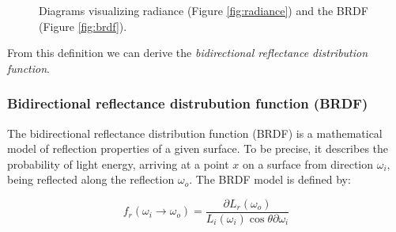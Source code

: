 \begin{figure}[h]
	\centering
	\hfill
	\caption{Diagrams visualizing radiance (Figure \ref{fig:radiance}) and the BRDF (Figure \ref{fig:brdf}).}
\end{figure}

From this definition we can derive the \emph{bidirectional reflectance distribution function}.

\subsubsection{Bidirectional reflectance distrubution function (BRDF)}
The bidirectional reflectance distribution function (BRDF) is a mathematical model of reflection properties of a given surface. To be precise, it describes the probability of light energy, arriving at a point $x$ on a surface from direction $\omega_{i}$, being reflected along the reflection $\omega_{o}$. 
The BRDF model is defined by:

\begin{equation} \label{eq:brdf}
f_{r}(\omega_{i} \rightarrow \omega_{o}) = \frac{\partial L_{r}(\omega_{o})}{L_{i}(\omega_{i})\cos\theta\partial\omega_{i}}
\end{equation}

